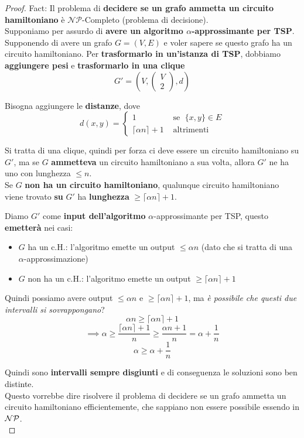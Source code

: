 \begin{proof}
	Fact: Il problema di \textbf{decidere se un grafo ammetta un circuito hamiltoniano} è $\mathcal{NP}$-Completo (problema di decisione).\\
	
	Supponiamo per assurdo di \textbf{avere un algoritmo $\alpha$-approssimante per TSP}. \\
	
	Supponendo di avere un grafo $G=(V,E)$ e voler sapere se questo grafo ha un circuito hamiltoniano. Per \textbf{trasformarlo in un'istanza di TSP}, dobbiamo \textbf{aggiungere pesi} e \textbf{trasformarlo in una clique}
	$$ G' = \left(V, \left(
	\begin{array}{c}
		V\\
		2
	\end{array}
	\right), d \right)$$
	
	Bisogna aggiungere le \textbf{distanze}, dove
	$$ 
	d(x,y) = \begin{cases}
		1 & \text{ se } \; \{x,y\} \in E \\
		\lceil \alpha n \rceil + 1 & \text{ altrimenti}
	\end{cases}
	$$
	
	Si tratta di una clique, quindi per forza ci deve essere un circuito hamiltoniano su $G'$, ma se $G$ \textbf{ammetteva} un circuito hamiltoniano a sua volta, allora $G'$ ne ha uno con lunghezza $\leq n$.\\
	Se $G$ \textbf{non ha un circuito hamiltoniano}, qualunque circuito hamiltoniano viene trovato \textbf{su} $G'$ ha \textbf{lunghezza} $\geq \lceil \alpha n\rceil + 1$.\\
	
	\newpage
	
	Diamo $G'$ come \textbf{input dell'algoritmo} $\alpha$-approssimante per TSP, questo \textbf{emetterà} nei casi:
	\begin{itemize}
		\item $G$ ha un c.H.: l'algoritmo emette un output $\leq \alpha n$ (dato che si tratta di una $\alpha$-approssimazione)
		\item $G$ non ha un c.H.: l'algoritmo emette un output $\geq \lceil \alpha n \rceil + 1$
	\end{itemize}
	
	Quindi possiamo avere output $\leq \alpha n$ e  $\geq \lceil \alpha n \rceil + 1$, ma \textit{è possibile che questi due intervalli si sovrappongano}?
	$$ \alpha n \geq \lceil \alpha n \rceil + 1 $$
	$$ \implies \alpha \geq \frac{\lceil \alpha n \rceil + 1}{n} \geq \frac{\alpha n + 1}{n} = \alpha + \frac{1}{n}$$
	$$ \alpha \geq \alpha + \frac{1}{n}$$
	
	Quindi sono \textbf{intervalli sempre disgiunti} e di conseguenza le soluzioni sono ben distinte.\\
	
	Questo vorrebbe dire risolvere il problema di decidere se un grafo ammetta un circuito hamiltoniano efficientemente, che sappiano non essere possibile essendo in $\mathcal{NP}$.\\
\end{proof}

\newpage